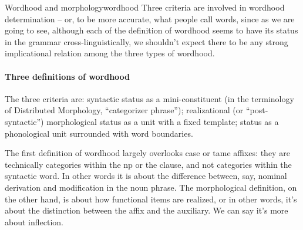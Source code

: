 \documentclass[a4paper, oneside]{report}
\begin{document}
\begin{theorybox}{Wordhood and morphology}{wordhood}
    Three criteria are involved in wordhood determination -- 
    or, to be more accurate, what people call words,
    since as we are going to see, 
    although each of the definition of wordhood 
    seems to have its status in the grammar cross-linguistically,
    we shouldn't expect there to be any strong implicational relation 
    among the three types of wordhood.
    
    \paragraph*{Three definitions of wordhood} The three criteria are: 
    syntactic status as a mini-constituent 
    (in the terminology of Distributed Morphology, ``categorizer phrase'');
    realizational (or ``post-syntactic'') morphological  status 
    as a unit with a fixed template;
    status as a phonological unit surrounded with word boundaries.

    The first definition of wordhood largely overlooks 
    case or \acs{tame} affixes:
    they are technically categories within the \acs{np} or the clause, 
    and not categories within the syntactic word.
    In other words it is about the difference 
    between, say, nominal derivation and modification in the noun phrase.
    The morphological definition, on the other hand, 
    is about how functional items are realized, 
    or in other words, it's about the distinction 
    between the affix and the auxiliary.
    We can say it's more about inflection.
    

\end{theorybox}
\end{document}
